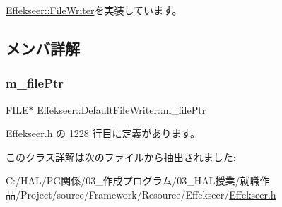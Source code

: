 \mbox{\hyperlink{class_effekseer_1_1_file_writer_a7bdd5dc4f70f8e83c03de7e96af5dc27}{Effekseer\+::\+File\+Writer}}を実装しています。



\subsection{メンバ詳解}
\mbox{\label{class_effekseer_1_1_default_file_writer_a66ba60cd1b40e5dfea801758b6d2b307}} 
\subsubsection{\texorpdfstring{m\+\_\+file\+Ptr}{m\_filePtr}}
{\footnotesize\ttfamily F\+I\+LE$\ast$ Effekseer\+::\+Default\+File\+Writer\+::m\+\_\+file\+Ptr\hspace{0.3cm}{\ttfamily [private]}}



 Effekseer.\+h の 1228 行目に定義があります。



このクラス詳解は次のファイルから抽出されました\+:\begin{DoxyCompactItemize}
\item 
C\+:/\+H\+A\+L/\+P\+G関係/03\+\_\+作成プログラム/03\+\_\+\+H\+A\+L授業/就職作品/\+Project/source/\+Framework/\+Resource/\+Effekseer/\mbox{\hyperlink{_effekseer_8h}{Effekseer.\+h}}\end{DoxyCompactItemize}
